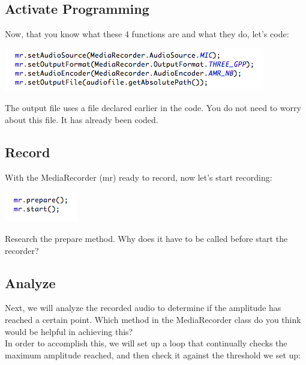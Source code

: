 \subsection{Activate Programming}
Now, that you know what these 4 functions are and what they do, let's code:\\

\begin{center}

\includegraphics[scale=1]{mediaRecorder.png} 

\end{center}

\noindent	
The output file uses a file declared earlier in the code. You do not need to worry about this file. It has already been coded.

\subsection{Record}
With the MediaRecorder (mr) ready to record, now let's start recording:\\

\begin{center}

\includegraphics[scale=1]{startRecord.png} 

\end{center}

\noindent
Research the prepare method. Why does it have to be called before start the recorder?

\subsection{Analyze}
Next, we will analyze the recorded audio to determine if the amplitude has reached a certain point. Which method in the MediaRecorder class do you think would be helpful in achieving this?\\

\noindent
In order to accomplish this, we will set up a loop that continually checks the maximum amplitude reached, and then check it against the threshold we set up:\\

